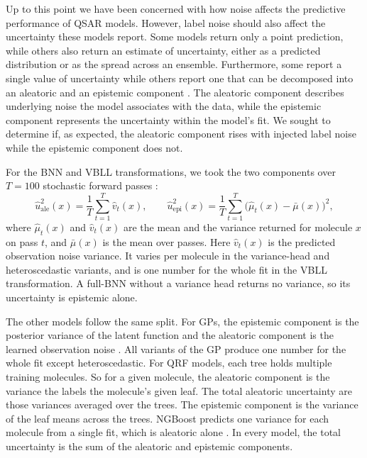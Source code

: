 Up to this point we have been concerned with how noise affects the predictive performance of QSAR models. However, label noise should also affect the uncertainty these models report. Some models return only a point prediction, while others also return an estimate of uncertainty, either as a predicted distribution or as the spread across an ensemble. Furthermore, some report a single value of uncertainty while others report one that can be decomposed into an aleatoric and an epistemic component \citep{kendall2017}. The aleatoric component describes underlying noise the model associates with the data, while the epistemic component represents the uncertainty within the model's fit. We sought to determine if, as expected, the aleatoric component rises with injected label noise while the epistemic component does not.

For the BNN and VBLL transformations, we took the two components over $T = 100$ stochastic forward
passes \citep{kendall2017}:
\begin{equation}
\hat{u}^2_{\text{ale}}(x) = \frac{1}{T}\sum_{t=1}^{T}\hat{v}_t(x),
\qquad
\hat{u}^2_{\text{epi}}(x) = \frac{1}{T}\sum_{t=1}^{T}\big(\hat{\mu}_t(x) - \bar{\mu}(x)\big)^2 ,
\label{eq:sampling_split}
\end{equation}
where $\hat{\mu}_t(x)$ and $\hat{v}_t(x)$ are the mean and the variance returned for molecule $x$ on
pass $t$, and $\bar{\mu}(x)$ is the mean over passes. Here $\hat{v}_t(x)$ is the predicted observation
noise variance. It varies per molecule in the variance-head and heteroscedastic variants, and is one
number for the whole fit in the VBLL transformation. A full-BNN without a variance head returns no
variance, so its uncertainty is epistemic alone.

The other models follow the same split. For GPs, the epistemic component is the posterior variance of the latent function and the aleatoric component is the learned observation noise \citep{Rasmussen2005}. All variants of the GP produce one number for the whole fit except heteroscedastic. For QRF models, each tree holds multiple training molecules. So for a given molecule, the aleatoric component is the variance the labels the molecule's given leaf. The total aleatoric uncertainty are those variances averaged over the trees. The epistemic component is the variance of the leaf means across the trees. NGBoost predicts one variance for each molecule from a single fit, which is aleatoric alone \citep{Duan2020}. In every model, the total uncertainty is the sum of the aleatoric and epistemic components.

